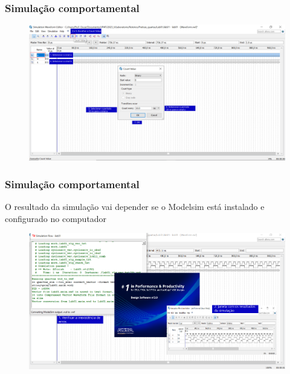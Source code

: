 \documentclass{CPSPresentation}
\begin{document}
\begin{frame}
	\frametitle{Simulação comportamental}
	
	
	\begin{figure}[h]
		\centering
		\includegraphics[width=1.02\textwidth]{quartus/fig20.pdf}
	\end{figure}
	
	
\end{frame}
\begin{frame}
	\frametitle{Simulação comportamental}
	
	
	\begin{block}{}
		\justifying
		O resultado da simulação vai depender se o Modelsim está instalado e configurado no computador
	\end{block}
	
	
	\begin{figure}[h]
		\centering
		\includegraphics[width=1.02\textwidth]{quartus/fig21.pdf}
	\end{figure}
	
	
\end{frame}
\end{document}

